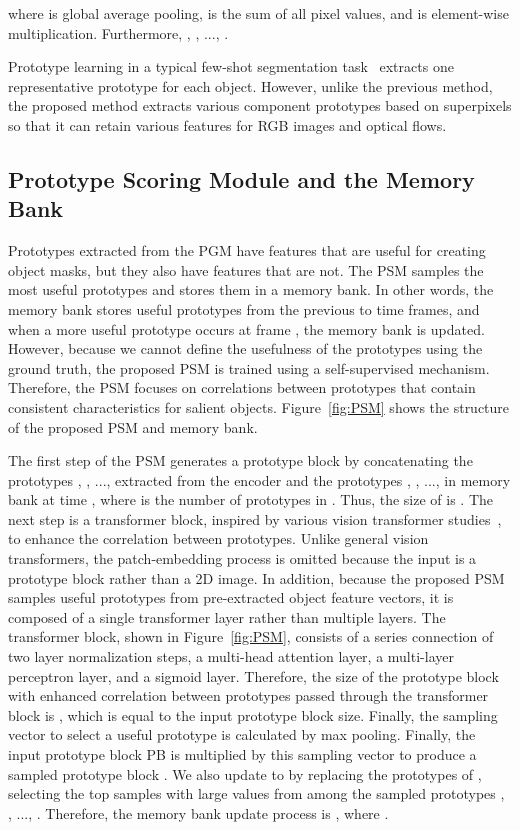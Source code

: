\documentclass[10pt,twocolumn,letterpaper]{article}
\begin{document}
\noindent
where  is global average pooling,  is the sum of all pixel values, and  is element-wise multiplication. Furthermore, , , ..., . 

Prototype learning in a typical few-shot segmentation task~\cite{dong2018few, wang2019panet, liu2020part, yang2020prototype, yu2021location, li2021adaptive} extracts one representative prototype for each object. However, unlike the previous method, the proposed method extracts various component prototypes based on superpixels so that it can retain various features for RGB images and optical flows.

\subsection{Prototype Scoring Module and the Memory Bank}
Prototypes extracted from the PGM have features that are useful for creating object masks, but they also have features that are not. The PSM samples the most useful prototypes and stores them in a memory bank. In other words, the memory bank stores useful prototypes from the previous  to  time frames, and when a more useful prototype occurs at frame , the memory bank is updated. However, because we cannot define the usefulness of the prototypes using the ground truth, the proposed PSM is trained using a self-supervised mechanism. Therefore, the PSM focuses on correlations between prototypes that contain consistent characteristics for salient objects. Figure~\ref{fig:PSM} shows the structure of the proposed PSM and memory bank.

The first step of the PSM generates a prototype block  by concatenating the prototypes , , ...,  extracted from the encoder and the prototypes , , ...,  in memory bank  at time , where  is the number of prototypes in . Thus, the size of  is . The next step is a transformer block, inspired by various vision transformer studies~\cite{dosovitskiy2020image, zheng2021rethinking, wang2021end}, to enhance the correlation between prototypes. Unlike general vision transformers, the patch-embedding process is omitted because the input is a prototype block rather than a 2D image. In addition, because the proposed PSM samples useful prototypes from pre-extracted object feature vectors, it is composed of a single transformer layer rather than multiple layers. The transformer block, shown in Figure~\ref{fig:PSM}, consists of a series connection of two layer normalization steps, a multi-head attention layer, a multi-layer perceptron layer, and a sigmoid layer. Therefore, the size of the prototype block with enhanced correlation between prototypes passed through the transformer block is , which is equal to the input prototype block size. Finally, the sampling vector  to select a useful prototype is calculated by max pooling. Finally, the input prototype block PB is multiplied by this sampling vector to produce a sampled prototype block . We also update  to  by replacing the prototypes of , selecting the top  samples with large  values from among the sampled prototypes , , ..., . Therefore, the memory bank update process is , where .
\end{document}
